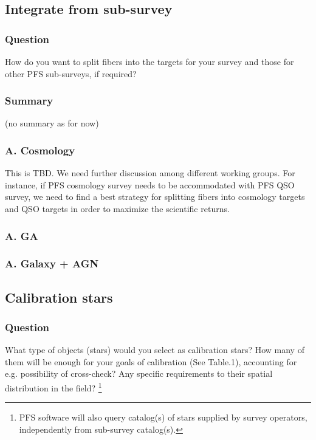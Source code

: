 \documentclass[a4paper,notitlepage]{article}
\begin{document}
\subsection{Integrate from sub-survey}

\subsubsection{Question}
How do you want to split fibers into the targets for
           your survey and those for other PFS sub-surveys, if
           required?

\subsubsection{Summary}

(no summary as for now)

\subsubsection{A. Cosmology}
This is TBD. We need further discussion among different working
groups. For instance, if PFS cosmology survey needs to be accommodated
with PFS QSO survey, we need to find a best strategy for splitting
fibers into cosmology targets and QSO targets in order to maximize the
scientific returns.

\subsubsection{A. GA}

\subsubsection{A. Galaxy + AGN}


\subsection{Calibration stars}

\subsubsection{Question}
What type of objects (stars) would you select as
           calibration stars? How many of them will be enough for
           your goals of calibration (See
           Table.1), accounting for
           e.g. possibility of cross-check? Any specific
           requirements to their spatial distribution in the field?
           \footnote{PFS software will also query catalog(s) of stars 
           supplied by survey operators, 
           independently from sub-survey catalog(s).} 
\end{document}

